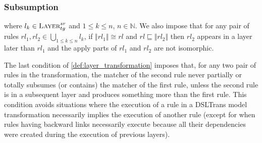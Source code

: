 % 


\subsubsection*{Subsumption}

 where $l_{k}\in \textsc{Layer}^{sr}_{tg}$ and $1\leq k \leq n$, $n\in \mathbb{N}$. We also impose that for any pair of rules $rl_1,rl_2\in \bigcup_{1\leq k\leq n}l_k$, if $\Vert rl_1\Vert \cong rl$ and $rl\sqsubseteq \Vert rl_2\Vert $ then $rl_2$ appears in a layer later than $rl_1$ and the apply parts of $rl_1$ and $rl_2$ are not isomorphic. 

The last condition of \cref{def:layer_transformation} imposes that, for any two pair of rules in the transformation, the matcher of the second rule never partially or totally subsumes (or contains) the matcher of the first rule, unless the second rule is in a subsequent layer and produces something more than the first rule. This condition avoids situations where the execution of a rule in a DSLTrans model transformation necessarily implies the execution of another rule (except for when rules having backward links necessarily execute because all their dependencies were created during the execution of previous layers). 
  



